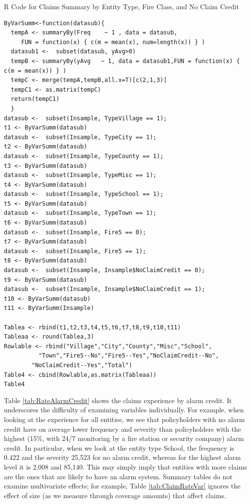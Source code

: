\documentclass[]{book}
\theoremstyle{definition}
\theoremstyle{definition}
\theoremstyle{definition}
\theoremstyle{remark}
\begin{document}
R Code for Claims Summary by Entity Type, Fire Class, and No Claim
Credit

\hypertarget{display.ClaimRateVar.2}{}
\begin{verbatim}
ByVarSumm<-function(datasub){
  tempA <- summaryBy(Freq    ~ 1 , data = datasub,   
     FUN = function(x) { c(m = mean(x), num=length(x)) } )
  datasub1 <-  subset(datasub, yAvg>0)
  tempB <- summaryBy(yAvg   ~ 1, data = datasub1,FUN = function(x) { c(m = mean(x)) } )
  tempC <- merge(tempA,tempB,all.x=T)[c(2,1,3)]
  tempC1 <- as.matrix(tempC)
  return(tempC1)
  }
datasub <-  subset(Insample, TypeVillage == 1);   
t1 <- ByVarSumm(datasub)
datasub <-  subset(Insample, TypeCity == 1);      
t2 <- ByVarSumm(datasub)
datasub <-  subset(Insample, TypeCounty == 1);   
t3 <- ByVarSumm(datasub)
datasub <-  subset(Insample, TypeMisc == 1);      
t4 <- ByVarSumm(datasub)
datasub <-  subset(Insample, TypeSchool == 1);    
t5 <- ByVarSumm(datasub)
datasub <-  subset(Insample, TypeTown == 1);      
t6 <- ByVarSumm(datasub)
datasub <-  subset(Insample, Fire5 == 0);                      
t7 <- ByVarSumm(datasub)
datasub <-  subset(Insample, Fire5 == 1);                      
t8 <- ByVarSumm(datasub)
datasub <-  subset(Insample, Insample$NoClaimCredit == 0);
t9 <- ByVarSumm(datasub)
datasub <-  subset(Insample, Insample$NoClaimCredit == 1);
t10 <- ByVarSumm(datasub)
t11 <- ByVarSumm(Insample)

Tablea <- rbind(t1,t2,t3,t4,t5,t6,t7,t8,t9,t10,t11)
Tableaa <- round(Tablea,3)
Rowlable <- rbind("Village","City","County","Misc","School",
          "Town","Fire5--No","Fire5--Yes","NoClaimCredit--No",
        "NoClaimCredit--Yes","Total")
Table4 <- cbind(Rowlable,as.matrix(Tableaa))
Table4
\end{verbatim}

Table \ref{tab:RateAlarmCredit} shows the claims experience by alarm
credit. It underscores the difficulty of examining variables
individually. For example, when looking at the experience for all
entities, we see that policyholders with no alarm credit have on average
lower frequency and severity than policyholders with the highest (15\%,
with 24/7 monitoring by a fire station or security company) alarm
credit. In particular, when we look at the entity type School, the
frequency is 0.422 and the severity 25,523 for no alarm credit, whereas
for the highest alarm level it is 2.008 and 85,140. This may simply
imply that entities with more claims are the ones that are likely to
have an alarm system. Summary tables do not examine multivariate
effects; for example, Table \ref{tab:ClaimRateVar} ignores the effect of
size (as we measure through coverage amounts) that affect claims.
\end{document}
